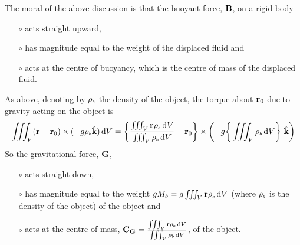 The moral of the above discussion is that the buoyant force, $\mathbf{B}$,
on a rigid body
\begin{itemize}\itemsep1pt \parskip0pt  %
\item[$\circ$]
acts straight upward, 
\item[$\circ$] 
has magnitude equal to the weight of the displaced fluid and 
\item[$\circ$] 
acts at the centre of buoyancy, which is the centre of mass 
of the displaced fluid. 
\end{itemize}
As above, denoting by ${\rho_{{\scriptscriptstyle b}}}$ the density of the object, 
the torque about $\mathbf{r}_0$ due to gravity acting on the object is
\begin{equation*}
\tripInt_V (\vr-\vr_0)\times(-g\rhob\hk)\,\dee{V}
=\bigg\{\frac{\tripInt_V \vr\rhob\,\dee{V}}
            {\tripInt_V\rhob\,\dee{V}}-\vr_0\bigg\}\times
                  \left(-g\bigg\{\tripInt_V \rhob\,\dee{V}\bigg\}\ \hk\right)
\end{equation*}
So the gravitational force, $\mathbf{G}$, 
\begin{itemize}\itemsep1pt \parskip0pt  %
\item[$\circ$]
acts straight down, 
\item[$\circ$] 
has magnitude equal to the weight 
$g M_b=g\iiint_V \mathbf{r}{\rho_{{\scriptscriptstyle b}}}\,\mathrm{d}V$ (where ${\rho_{{\scriptscriptstyle b}}}$ is the density of 
the object) of the object and 
\item[$\circ$] 
acts at the centre of mass,
$
\mathbf{C}_{\mathbf{G}}=\frac{\iiint_V \mathbf{r}{\rho_{{\scriptscriptstyle b}}}\,\mathrm{d}V}{\iiint_V{\rho_{{\scriptscriptstyle b}}}\,\mathrm{d}V}
$, 
of the object.
\end{itemize}

